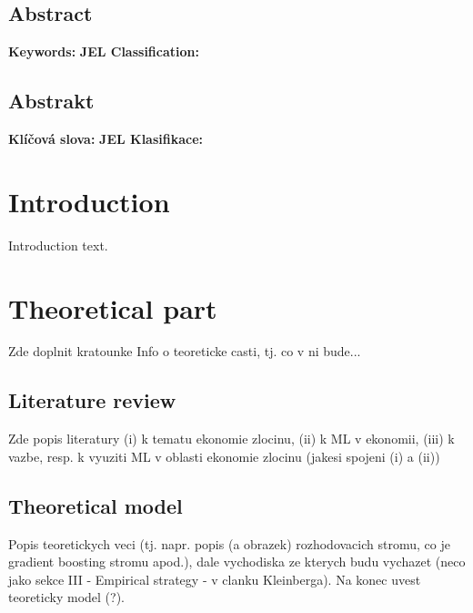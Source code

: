 \documentclass[12pt, twoside]{book} %
\renewcommand{\baselinestretch}{1.5}
\begin{document}
\section*{Abstract}   %
\textbf{Keywords:} \newline
\textbf{JEL Classification:}


\section*{Abstrakt}
\textbf{Klíčová slova:} \newline
\textbf{JEL Klasifikace:}

\tableofcontents    %
\renewcommand{\thepage}{\arabic{page}}
\renewcommand{\baselinestretch}{1.5}


\chapter*{Introduction}     %
\pagestyle{plain}
Introduction text.


\chapter{Theoretical part}    %

Zde doplnit kratounke Info o teoreticke casti, tj. co v ni bude...


\section{Literature review}     %

Zde popis literatury (i) k tematu ekonomie zlocinu, (ii) k ML v ekonomii, (iii) k vazbe, resp. k vyuziti ML v oblasti ekonomie zlocinu (jakesi spojeni (i) a (ii))

\section{Theoretical model}    %
 
Popis teoretickych veci (tj. napr. popis (a obrazek) rozhodovacich stromu, co je gradient boosting stromu apod.), dale vychodiska ze kterych budu vychazet (neco jako sekce III - Empirical strategy - v clanku Kleinberga). Na konec uvest teoreticky model (?).
\end{document}
